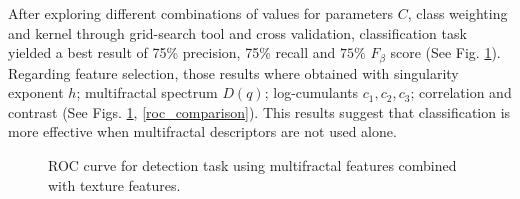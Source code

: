\documentclass{article}
\begin{document}
After exploring different combinations of values for parameters $C$, class weighting and kernel  through grid-search tool and cross validation, classification task yielded a best result of 75\% precision, 75\% recall and $75\%$ $F_\beta$ score (See Fig. \ref{roc_auc}). Regarding feature selection, those results where obtained with singularity exponent $h$; multifractal spectrum $D(q)$; log-cumulants $c_1, c_2, c_3$; correlation and contrast (See Figs. \ref{roc_auc}, \ref{roc_comparison}). This results suggest that classification is more effective when multifractal descriptors are not used alone. 

\begin{figure}[ht]
	\centering
	\caption{ROC curve for detection task using multifractal features combined with texture features.} \label{roc_auc}
\end{figure}
\end{document}
